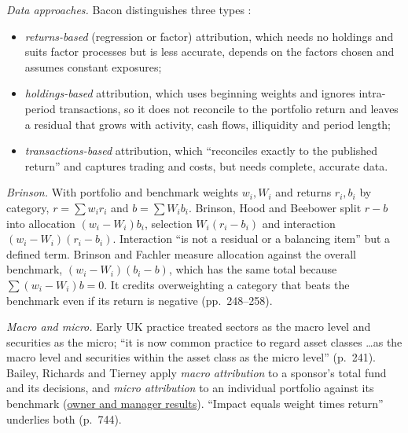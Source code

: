 \begin{qfmethod}\label{meth:return-attribution}
 \emph{Data approaches.} Bacon distinguishes three types \citep[3rd ed., 2023, chap.~6, pp.~244--247, Table~6.2]{wide-bacon-attribution}:
\begin{itemize}
\item \emph{returns-based} (regression or factor) attribution, which needs no holdings and suits factor processes but is less accurate, depends on the factors chosen and assumes constant exposures;
\item \emph{holdings-based} attribution, which uses beginning weights and ignores intra-period transactions, so it does not reconcile to the portfolio return and leaves a residual that grows with activity, cash flows, illiquidity and period length;
\item \emph{transactions-based} attribution, which ``reconciles exactly to the published return'' and captures trading and costs, but needs complete, accurate data.
\end{itemize}

\emph{Brinson.} With portfolio and benchmark weights $w_i,W_i$ and returns $r_i,b_i$ by category, $r=\sum w_ir_i$ and $b=\sum W_ib_i$. Brinson, Hood and Beebower split $r-b$ into allocation $(w_i-W_i)b_i$, selection $W_i(r_i-b_i)$ and interaction $(w_i-W_i)(r_i-b_i)$. Interaction ``is not a residual or a balancing item'' but a defined term. Brinson and Fachler measure allocation against the overall benchmark, $(w_i-W_i)(b_i-b)$, which has the same total because $\sum(w_i-W_i)b=0$. It credits overweighting a category that beats the benchmark even if its return is negative (pp.~248--258).

\emph{Macro and micro.} Early UK practice treated sectors as the macro level and securities as the micro; ``it is now common practice to regard asset classes \ldots as the macro level and securities within the asset class as the micro level'' (p.~241). Bailey, Richards and Tierney apply \emph{macro attribution} to a sponsor's total fund and its decisions, and \emph{micro attribution} to an individual portfolio against its benchmark \citep[chap.~12, pp.~746 and~753]{managing-investment-portfolios-2007} (\hyperref[meth:macro-attribution-owner-manager]{owner and manager results}). ``Impact equals weight times return'' underlies both (p.~744).


\end{qfmethod}
